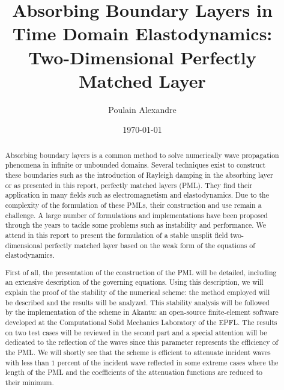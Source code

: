 \documentclass[11pt]{article}
\title{Absorbing Boundary Layers in Time Domain Elastodynamics: Two-Dimensional Perfectly Matched Layer}
\author{Poulain Alexandre}
\date{\today}
\begin{document}
\pagestyle{empty}


\newpage
\renewcommand{\abstractname}{Abstract}
\begin{abstract}
Absorbing boundary layers is a common method to solve numerically wave propagation phenomena in infinite or unbounded domains. Several techniques exist to construct these boundaries such as the introduction of Rayleigh damping in the absorbing layer or as presented in this report, perfectly matched layers (PML). They find their application in many fields such as electromagnetism and elastodynamics.   
Due to the complexity of the formulation of these PMLs, their construction and use remain a challenge. A large number of formulations and implementations have been proposed through the years to tackle some problems such as instability and performance.  
We attend in this report to present the formulation of a stable unsplit field two-dimensional perfectly matched layer based on the weak form of the equations of elastodynamics. 

\noindent First of all, the presentation of the construction of the PML will be detailed, including an extensive description of the governing equations. Using this description, we will explain the proof of the stability of the numerical scheme: the method employed will be described and the results will be analyzed. This stability analysis will be followed by the implementation of the scheme in Akantu: an open-source finite-element software developed at the Computational Solid Mechanics Laboratory of the EPFL. The results on two test cases will be reviewed in the second part and a special attention will be dedicated to the reflection of the waves since this parameter represents the efficiency of the PML. We will shortly see that the scheme is efficient to attenuate incident waves with less than $1$ percent of the incident wave reflected in some extreme cases where the length of the PML and the coefficients of the attenuation functions are reduced to their minimum.   






\end{abstract}


\newpage

\tableofcontents

\newpage


\newpage


\newpage

\newpage


\newpage



\newpage


\end{document}
